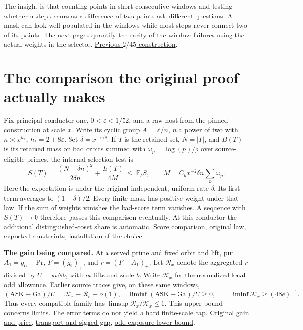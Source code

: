 \documentclass[12pt,letterpaper]{article}
\newcommand{\orig}[3]{\href{https://github.com/nousentllc/riemann-hypothesis/blob/40e56bab026552e089d7afcfeff08d2defb9c005/src/#1.lean\#L#2}{#3}}
\newcommand{\para}[1]{\par\medskip\noindent\textbf{#1}\quad}
\newcommand{\pagepart}[1]{\clearpage\section{#1}}
\newcommand{\gap}{\mathrm{ASK}-\mathrm{Ga}}
\begin{document}
The insight is that counting points in short consecutive windows and testing whether a step occurs as a difference of two points ask different questions. A mask can look well populated in the windows while most steps never connect two of its points. The next pages quantify the rarity of the window failures using the actual weights in the selector. \href{https://github.com/nousentllc/riemann-hypothesis/pull/12}{Previous \(2/45\) construction}.

\pagepart{The comparison the original proof actually makes}
Fix principal conductor one, \(0<\varepsilon<1/52\), and a raw host from the pinned construction at scale \(x\). Write its cyclic group \(A=\mathbb Z/n\), \(n\) a power of two with \(n\asymp x^{h_*}\), \(h_*=2+8\varepsilon\). Set \(\delta=x^{-\varepsilon/8}\). If \(T\) is the retained set, \(N=|T|\), and \(B(T)\) is its retained mass on bad orbits summed with \(\omega_p=\log(p)/p\) over source-eligible primes, the internal selection test is
\[
 S(T)=\frac{(N-\delta n)^2}{2\delta n}+\frac{B(T)}{4M}
 \ \le\ \mathbb E_{\delta}S,\qquad
 M=C_b x^{-2}\delta n\sum_p\omega_p .
\]
Here the expectation is under the original independent, uniform rate \(\delta\). Its first term averages to \((1-\delta)/2\). Every finite mask has positive weight under that law. If the sum of weights vanishes the bad-score term vanishes. A sequence with \(S(T)\to0\) therefore passes this comparison eventually. At this conductor the additional distinguished-coset share is automatic. \orig{Development/AutomorphicArithmetic/ThickFrames/select}{136}{Score comparison}, \orig{Development/AutomorphicArithmetic/ThickFrames/topsGroup}{101}{original law}, \orig{Development/AutomorphicArithmetic/ThickFrames/topsChoiceH}{33}{exported constraints}, \orig{Development/AutomorphicArithmetic/ShortNorms/hostOfFieldOf}{218}{installation of the choice}.

\para{The gain being compared.} At a served prime and fixed orbit and lift, put \(A_1=g_U-\mathrm{Pr}\), \(F=(g_0)_+\), and \(r=(F-A_1)_+\). Let \(\mathcal R_x\) denote the aggregated \(r\) divided by \(U=mNb\), with \(m\) lifts and scale \(b\). Write \(\mathcal K_x\) for the normalized local odd allowance. Earlier source traces give, on these same windows,
\[
 (\gap)/U=\mathcal K_x-\mathcal R_x+o(1),\quad
 \liminf(\gap)/U\ge0,\qquad \liminf\mathcal K_x\ge (48e)^{-1}.
\]
Thus every compatible family has \(\limsup\mathcal R_x/\mathcal K_x\le1\). This upper bound concerns limits. The error terms do not yield a hard finite-scale cap. \orig{Formalism/SharpRestriction/GrowthBounds/IsResidueClassZero}{241}{Original gain and price}, \href{https://github.com/nousentllc/riemann-hypothesis/pull/11}{transport and signed gap}, \href{https://github.com/nousentllc/riemann-hypothesis/pull/10}{odd-exposure lower bound}.
\end{document}
